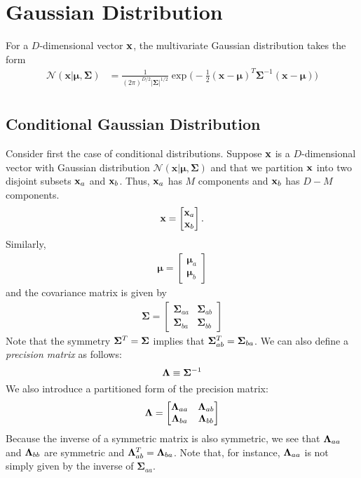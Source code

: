 \section{Gaussian Distribution}
For a $D$-dimensional vector ${\mathbf{x}}$, the multivariate Gaussian distribution takes the form
\begin{align}
	\mathcal{N}(\mathbf{x}|\boldsymbol{\mu},\boldsymbol{\Sigma}) &= \frac{1}{(2\pi)^{D/2}|\boldsymbol{\Sigma}|^{1/2}}\exp\bigg(-\frac{1}{2}(\mathbf{x}-\boldsymbol{\mu})^T\boldsymbol{\Sigma}^{-1}(\mathbf{x}-\boldsymbol{\mu})\bigg)\\
	\label{eq:normal_distribution}
\end{align}

\subsection{Conditional Gaussian Distribution}
Consider first the case of conditional distributions. Suppose ${\mathbf{x}}$ is a $D$-dimensional vector with Gaussian distribution $\mathcal{N}(\mathbf{x}|\boldsymbol{\mu},\boldsymbol{\Sigma})$ and that we partition ${\mathbf{x}}$ into two disjoint subsets ${\mathbf{x}}_a$ and ${\mathbf{x}}_b$. Thus, ${\mathbf{x}}_a$ has $M$ components and ${\mathbf{x}}_b$ has $D-M$ components.
\begin{align*}
	{\mathbf{x}} = \begin{bmatrix}
		{\mathbf{x}}_a\\
		{\mathbf{x}}_b
	\end{bmatrix}.
\end{align*}
Similarly, 
\begin{align*}
	\boldsymbol{\mu} = \begin{bmatrix}
		\boldsymbol{\mu}_a\\
		\boldsymbol{\mu}_b
	\end{bmatrix} 
\end{align*}
and the covariance matrix is given by
\begin{align*}
	\boldsymbol{\Sigma} = \begin{bmatrix}
		\boldsymbol{\Sigma}_{aa} & \boldsymbol{\Sigma}_{ab}\\
		\boldsymbol{\Sigma}_{ba} & \boldsymbol{\Sigma}_{bb} 
	\end{bmatrix} 
\end{align*}
Note that the symmetry ${\bm{\Sigma}}^T = {\bm{\Sigma}}$ implies that ${\bm{\Sigma}}_{ab}^T={\bm{\Sigma}}_{ba}$. We can also define a \textit{precision matrix} as follows: 
$${\bm{\Lambda}} \equiv {\bm{\Sigma}}^{-1}$$
We also introduce a partitioned form of the precision matrix:
\begin{align}
	\boldsymbol{\Lambda} = \begin{bmatrix}
		{\bm{\Lambda}}_{aa} & {\bm{\Lambda}}_{ab}\\
		{\bm{\Lambda}}_{ba} & {\bm{\Lambda}}_{bb} 
	\end{bmatrix} 
	\label{eq:precision_matrix}
\end{align}
Because the inverse of a symmetric matrix is also symmetric, we see that ${\bm{\Lambda}}_{aa}$ and ${\bm{\Lambda}}_{bb}$ are symmetric and ${\bm{\Lambda}}_{ab}^T ={\bm{\Lambda}}_{ba}$. Note that, for instance, ${\bm{\Lambda}}_{aa}$ is not simply given by the inverse of $\boldsymbol{\Sigma}_{aa}$. 

